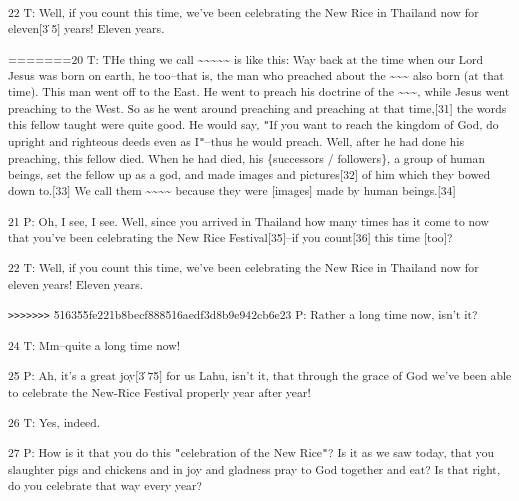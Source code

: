\textsuperscript{22 T: Well, if you count this time, we've been celebrating the
New Rice in Thailand now for eleven[3\.5] years! Eleven years.}

\textsuperscript{=======20 T: THe thing we call \textasciitilde{}\textasciitilde{}\textasciitilde{}\textasciitilde{}\textasciitilde{}
is like this: Way back at the time when our Lord Jesus was born on earth, he too--that
is, the man who preached about the \textasciitilde{}\textasciitilde{}\textasciitilde{}
also born (at that time). This man went off to the East. He went to preach his
doctrine of the \textasciitilde{}\textasciitilde{}\textasciitilde{}, while Jesus
went preaching to the West. So as he went around preaching and preaching at that
time,[31] the words this fellow taught were quite good. He would say, \texttt{"}If
you want to reach the kingdom of God, do upright and righteous deeds even as I\texttt{"}--thus
he would preach. Well, after he had done his preaching, this fellow died. When
he had died, his \{successors / followers\}, a group of human beings, set the fellow
up as a god, and made images and pictures[32] of him which they bowed down to.[33]
We call them \textasciitilde{}\textasciitilde{}\textasciitilde{}\textasciitilde{}
because they were [images] made by human beings.[34]}

\textsuperscript{21 P: Oh, I see, I see. Well, since you arrived in Thailand how
many times has it come to now that you've been celebrating the New Rice Festival[35]--if
you count[36] this time [too]?}

\textsuperscript{22 T: Well, if you count this time, we've been celebrating the
New Rice in Thailand now for eleven years! Eleven years.}

\textsuperscript{\texttt{>}\texttt{>}\texttt{>}\texttt{>}\texttt{>}\texttt{>}\texttt{>}
516355fe221b8becf888516aedf3d8b9e942cb6e23 P: Rather a long time now, isn't it?}

\textsuperscript{24 T: Mm--quite a long time now! }

\textsuperscript{25 P: Ah, it's a great joy[3\.75] for us Lahu, isn't it, that
through the grace of God we've been able to celebrate the New-Rice Festival properly
year after year! }

\textsuperscript{26 T: Yes, indeed.}

\textsuperscript{27 P: How is it that you do this \texttt{"}celebration of the
New Rice\texttt{"}? Is it as we saw today, that you slaughter pigs and chickens
and in joy and gladness pray to God together and eat? Is that right, do you celebrate
that way every year? }

